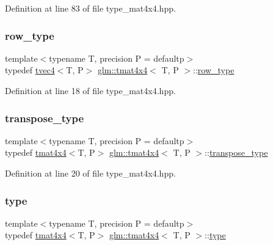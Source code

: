 Definition at line 83 of file type\+\_\+mat4x4.\+hpp.

\mbox{\label{structglm_1_1tmat4x4_a496208229e8d8b1bd58b20584eb6011c}} 
\subsubsection{\texorpdfstring{row\_type}{row\_type}}
{\footnotesize\ttfamily template$<$typename T, precision P = defaultp$>$ \\
typedef \mbox{\hyperlink{structglm_1_1tvec4}{tvec4}}$<$T, P$>$ \mbox{\hyperlink{structglm_1_1tmat4x4}{glm\+::tmat4x4}}$<$ T, P $>$\+::\mbox{\hyperlink{structglm_1_1tmat4x4_a496208229e8d8b1bd58b20584eb6011c}{row\+\_\+type}}}



Definition at line 18 of file type\+\_\+mat4x4.\+hpp.

\mbox{\label{structglm_1_1tmat4x4_ad1fd4876433fc643c5445fff52be9dc8}} 
\subsubsection{\texorpdfstring{transpose\_type}{transpose\_type}}
{\footnotesize\ttfamily template$<$typename T, precision P = defaultp$>$ \\
typedef \mbox{\hyperlink{structglm_1_1tmat4x4}{tmat4x4}}$<$T, P$>$ \mbox{\hyperlink{structglm_1_1tmat4x4}{glm\+::tmat4x4}}$<$ T, P $>$\+::\mbox{\hyperlink{structglm_1_1tmat4x4_ad1fd4876433fc643c5445fff52be9dc8}{transpose\+\_\+type}}}



Definition at line 20 of file type\+\_\+mat4x4.\+hpp.

\mbox{\label{structglm_1_1tmat4x4_a74740b596830a6a4c28f8e33965c9d3e}} 
\subsubsection{\texorpdfstring{type}{type}}
{\footnotesize\ttfamily template$<$typename T, precision P = defaultp$>$ \\
typedef \mbox{\hyperlink{structglm_1_1tmat4x4}{tmat4x4}}$<$T, P$>$ \mbox{\hyperlink{structglm_1_1tmat4x4}{glm\+::tmat4x4}}$<$ T, P $>$\+::\mbox{\hyperlink{structglm_1_1tmat4x4_a74740b596830a6a4c28f8e33965c9d3e}{type}}}



